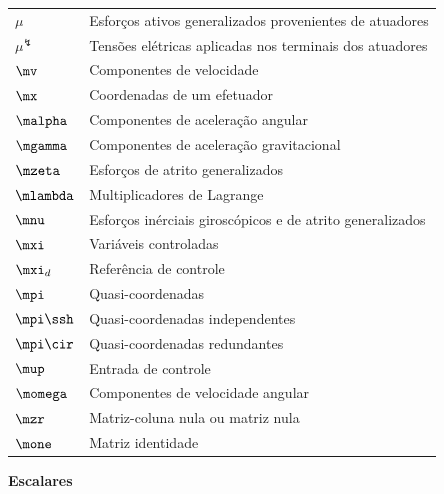 \documentclass[]{politex}
\begin{document}
\begin{longtable}{lp{}}
  $\mu$ & Esforços ativos generalizados provenientes de atuadores \\
  $\mu^\lightning$ & Tensões elétricas aplicadas nos terminais dos atuadores  \\
  $\mv$ & Componentes de velocidade \\
  $\mx$ & Coordenadas de um efetuador \\
  $\malpha$ & Componentes de aceleração angular \\
  $\mgamma$ & Componentes de aceleração gravitacional \\
  $\mzeta$ & Esforços de atrito generalizados \\
  $\mlambda$ & Multiplicadores de Lagrange \\
  $\mnu$ & Esforços inérciais giroscópicos e de atrito generalizados \\
  $\mxi$ & Variáveis controladas \\
  $\mxi_d$ & Referência de controle \\
  $\mpi$ & Quasi-coordenadas \\
  $\mpi\ssh$ & Quasi-coordenadas independentes \\
  $\mpi\cir$ & Quasi-coordenadas redundantes\\
  $\mup$ & Entrada de controle \\
  $\momega$ & Componentes de velocidade angular \\
  $\mzr$ & Matriz-coluna nula ou matriz nula \\
  $\mone$ & Matriz identidade \\
\end{longtable}
\begin{center} \begin{Large} \textbf{Escalares} \end{Large} \end{center}
\end{document}
